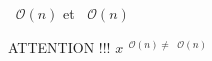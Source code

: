 \documentclass{article}
\newcommand{\bigO}[1]{\ensuremath{\mathop{}\mathopen{}\mathcal{O}\mathopen{}\left(#1\right)}}
\newcommand{\smallO}[1]{\ensuremath{\mathop{}\mathopen{}{\scriptstyle\mathcal{O}}\mathopen{}\left(#1\right)}}
\begin{document}
$\bigO{n}$ et $\smallO{n}$


ATTENTION !!! $x^{\bigO{n} \neq \smallO{n}}$
\end{document}
